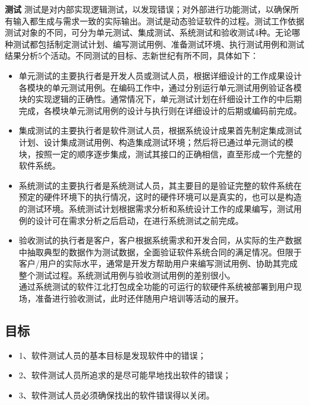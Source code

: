 \documentclass[UTF8,nofonts]{ctexart}
\makeatletter
\renewcommand{\section}{\@startsection{section}{1}{0mm}
  {-\baselineskip}{0.5\baselineskip}{\fontsize{16pt}{16pt}\bf\leftline}}
\makeatother
\begin{document}
\section{\textbf{测试}}
测试是对内部实现逻辑测试，以发现错误；对外部进行功能测试，以确保所有输入都生成与需求一致的实际输出。测试是动态验证软件的过程。测试工作依据测试对象的不同，可分为单元测试、集成测试、系统测试和验收测试4种。无论哪种测试都包括制定测试计划、编写测试用例、准备测试环境、执行测试用例和测试结果分析5个活动。不同测试的目标、志新世纪有所不同，具体如下：
\begin{itemize}
 \setlength{\itemsep}{0pt}
 \setlength{\parskip}{0pt}
 \setlength{\parsep}{0pt}
\item	单元测试的主要执行者是开发人员或测试人员，根据详细设计的工作成果设计各模块的单元测试用例。在编码工作中，通过分别运行单元测试用例验证各模块的实现逻辑的正确性。通常情况下，单元测试计划在纤细设计工作的中后期完成，各模块单元测试用例的设计与执行则在详细设计的后期或编码前完成。
\item	集成测试的主要执行者是软件测试人员，根据系统设计成果首先制定集成测试计划、设计集成测试用例、构造集成测试环境；然后将已通过单元测试的模块，按照一定的顺序逐步集成，测试其接口的正确相信，直至形成一个完整的软件系统。
\item	系统测试的主要执行者是系统测试人员，其主要目的是验证完整的软件系统在预定的硬件环境下的执行情况，这时的硬件环境可以是真实的，也可以是构造的测试环境。系统测试计划根据需求分析和系统设计工作的成果编写，测试用例的设计可在需求分析之后启动，在进行系统测试之前完成。
\item	验收测试的执行者是客户，客户根据系统需求和开发合同，从实际的生产数据中抽取典型的数据作为测试数据，全面验证软件系统合同的满足情况。但限于客户/用户的实际水平，通常是开发方帮助用户来编写测试用例、协助其完成整个测试过程。系统测试用例与验收测试用例的差别很小。\\
通过系统测试的软件江北打包成全功能的可运行的软硬件系统被部署到用户现场，准备进行验收测试，此时还伴随用户培训等活动的展开。
\end{itemize}
\subsection{\textbf{目标}}
\begin{itemize}
 \setlength{\itemsep}{0pt}
 \setlength{\parskip}{0pt}
 \setlength{\parsep}{0pt}
\item 1、软件测试人员的基本目标是发现软件中的错误；
\item 2、软件测试人员所追求的是尽可能早地找出软件的错误；
\item	3、软件测试人员必须确保找出的软件错误得以关闭。
\end{itemize}	
\end{document}
